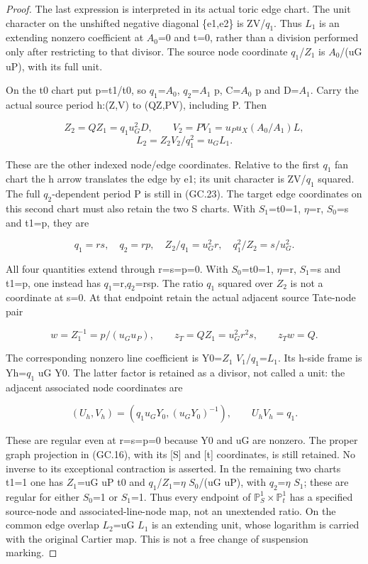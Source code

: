 \begin{proof}
The last expression is interpreted in its actual toric edge
chart. The unit character on the unshifted negative diagonal
\{e1,e2\} is ZV/\(q_1\). Thus \(L_1\) is an extending nonzero coefficient
at \(A_0\)=0 and t=0, rather than a division performed only after
restricting to that divisor. The source node coordinate
\(q_1\)/\(Z_1\) is \(A_0\)/(uG uP), with its full unit.

On the t0 chart put p=t1/t0, so \(q_1\)=\(A_0\), \(q_2\)=\(A_1\) p,
C=\(A_0\) p and D=\(A_1\). Carry the actual source period
h:(Z,V) to (QZ,PV), including P. Then

\[
 Z_2=QZ_1=q_1u_G^2D,\qquad
 V_2=PV_1=u_Pu_X(A_0/A_1)L,
\]
\[
             L_2=Z_2V_2/q_1^2=u_G L_1.
 \tag{GC.23}
\]

These are the other indexed node/edge coordinates. Relative to
the first \(q_1\) fan chart the h arrow translates the edge by e1;
its unit character is ZV/\(q_1\) squared. The full \(q_2\)-dependent
period P is still in (GC.23). The target edge coordinates on this second chart must also retain
the two S charts. With \(S_1\)=t0=1, \(\eta\)=r, \(S_0\)=s and t1=p, they are

\[
 q_1=rs,\quad q_2=rp,\quad
 Z_2/q_1=u_G^2r,\quad q_1^2/Z_2=s/u_G^2.
 \tag{GC.23a}
\]

All four quantities extend through r=s=p=0. With \(S_0\)=t0=1,
\(\eta\)=r, \(S_1\)=s and t1=p, one instead has \(q_1\)=r,\(q_2\)=rsp. The
ratio \(q_1\) squared over \(Z_2\) is not a coordinate at s=0. At that
endpoint retain the actual adjacent source Tate-node pair

\[
 w=Z_1^{-1}=p/(u_Gu_P),\qquad
 z_T=QZ_1=u_G^2r^2s,\qquad z_Tw=Q.
 \tag{GC.23b}
\]

The corresponding nonzero line coefficient is
Y0=\(Z_1\) \(V_1\)/\(q_1\)=\(L_1\). Its h-side frame is Yh=\(q_1\) uG Y0.
The latter factor is retained as a divisor, not called a unit:
the adjacent associated node coordinates are

\[
           (U_h,V_h)=(q_1u_GY_0,(u_GY_0)^{-1}),
                         \qquad U_hV_h=q_1.
 \tag{GC.23c}
\]

These are regular even at r=s=p=0 because Y0 and uG are
nonzero. The proper graph projection in (GC.16), with its
{[}S{]} and {[}t{]} coordinates, is still retained. No inverse to its
exceptional contraction is asserted. In the remaining two
charts t1=1 one has \(Z_1\)=uG uP t0 and
\(q_1\)/\(Z_1\)=\(\eta\) \(S_0\)/(uG uP), with \(q_2\)=\(\eta\) \(S_1\); these are regular for
either \(S_0\)=1 or \(S_1\)=1. Thus every endpoint of \(\mathbb P^1_S\times\mathbb P^1_t\)
has a specified source-node and associated-line-node map, not
an unextended ratio. On the common edge overlap \(L_2\)=uG \(L_1\) is
an extending unit, whose logarithm is carried with the original
Cartier map. This is not a free change of suspension marking.


\end{proof}
